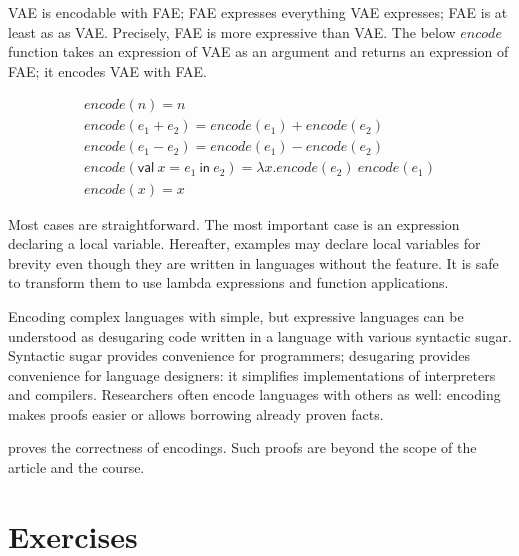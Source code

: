 VAE is encodable with FAE; FAE expresses everything VAE expresses; FAE is at
least as  as VAE. Precisely, FAE is more expressive than VAE.
The below \(\mathit{encode}\) function takes an expression of VAE as an argument
and returns an expression of FAE; it encodes VAE with FAE.

\[
\begin{array}{l}
\mathit{encode}(n)=n \\
\mathit{encode}(e_1+e_2)=\mathit{encode}(e_1)+\mathit{encode}(e_2) \\
\mathit{encode}(e_1-e_2)=\mathit{encode}(e_1)-\mathit{encode}(e_2) \\
\mathit{encode}(\textsf{val}\ x = e_1\ \textsf{in}\ e_2)=
\lambda x.\mathit{encode}(e_2)\ \mathit{encode}(e_1) \\
\mathit{encode}(x)=x
\end{array}
\]

Most cases are straightforward. The most important case is an expression
declaring a local variable. Hereafter, examples may declare local variables for
brevity even though they are written in languages without the feature. It is safe
to transform them to use lambda expressions and function applications.

Encoding complex languages with simple, but expressive languages can be
understood as desugaring code written in a language with various syntactic sugar.
Syntactic sugar provides convenience for programmers; desugaring provides
convenience for language designers: it simplifies implementations of interpreters
and compilers. Researchers often encode languages with others as well: encoding
makes proofs easier or allows borrowing already proven facts.

 proves the correctness of encodings. Such proofs are
beyond the scope of the article and the course.

\section{Exercises}
